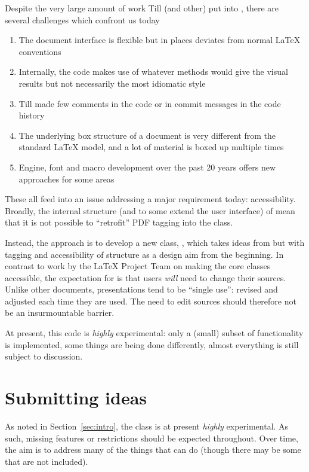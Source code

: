 \documentclass{l3doc}
\begin{document}
\begin{documentation}
Despite the very large amount of work Till (and other) put into ,
there are several challenges which confront us today
\begin{enumerate}
  \item The document interface is flexible but in places deviates from normal
    \LaTeX{} conventions
  \item Internally, the code makes use of whatever methods would give the
    visual results but not necessarily the most idiomatic style
  \item Till made few comments in the code or in commit messages in the code
    history
  \item The underlying box structure of a  document is very
    different from the standard \LaTeX{} model, and a lot of material is
    boxed up multiple times
  \item Engine, font and macro development over the past 20 years offers
    new approaches for some areas
\end{enumerate}
These all feed into an issue addressing a major requirement today:
accessibility. Broadly, the internal structure (and to some extend the user
interface) of  mean that it is not possible to \enquote{retrofit}
PDF tagging into the class.

Instead, the approach is to develop a new class, , which takes
ideas from  but with tagging and accessibility of structure as a
design aim from the beginning. In contrast to work by the \LaTeX{} Project Team
on making the core classes accessible, the expectation for  is
that users \emph{will} need to change their sources. Unlike other documents,
presentations tend to be \enquote{single use}: revised and adjusted each time
they are used. The need to edit sources should therefore not be an
insurmountable barrier.

At present, this code is \emph{highly} experimental: only a (small) subset of
 functionality is implemented, some things are being done
differently, almost everything is still subject to discussion.

\section{Submitting ideas}

As noted in Section~\ref{sec:intro}, the class is at present \emph{highly}
experimental. As such, missing features or restrictions should be expected
throughout. Over time, the aim is to address many of the things that
 can do (though there may be some that are not included).


\end{documentation}
\end{document}
